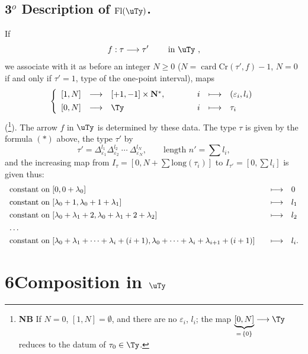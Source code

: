 \subsection*{3$^o$ Description of $\mathrm{Fl}(\uTy)$.}

If
\[
f : \tau \longrightarrow \tau' \qquad \ \text{in } \uTy\ ,
\]
we associate with it as before an integer \underline{$N \geq 0$} ($N = \operatorname{card}\mathrm{Cr}(\tau', f){-}1$, $N = 0$ if and only if $\tau' = 1$, type of the one-point interval), maps
\[
\left\{
\begin{array}{lcl@{\qquad\qquad}ccl}
{[1,N]} & \longrightarrow & [+1,-1] \times \mathbf{N}^*, & i & \longmapsto & (\varepsilon_i, l_i) \\[1ex]
{[0,N]} & \longrightarrow & \Ty & i & \longmapsto & \tau_i
\end{array}
\right.
\]
(\footnote[14]{\textbf{NB} If $N = 0$, $[1,N] = \emptyset$, and there are no $\varepsilon_i$, $l_i$; the map $\underbrace{[0,N]}_{=\,\{0\}} \longrightarrow \Ty$ reduces to the datum of $\tau_0 \in \Ty$.}). The arrow $f$ in $\uTy$ is determined by these data. The type $\tau$ is given by the formula $(*)$ above, the type $\tau'$ by %
\[
\tau' = \Delta^{l_1}_{\varepsilon_1} \Delta^{l_2}_{\varepsilon_2}\ \cdots\ \Delta^{l_N}_{\varepsilon_N}, \qquad \text{length } n' = \textstyle\sum l_i, \tag*{$(*')$}
\]
and the increasing map from $I_\tau = [0, N + \sum \mathrm{long}(\tau_i)]$ to $I_{\tau'} = [0, \sum l_i]$ is given thus:
\[
\begin{array}{l@{\qquad}cl}
\text{constant on } [0, 0+\lambda_0] & \longmapsto & 0 \\[1ex]
\text{constant on } [\lambda_0+1, \lambda_0+1+\lambda_1] & \longmapsto & l_1 \\[1ex]
\text{constant on } [\lambda_0+\lambda_1+2, \lambda_0+\lambda_1+2+\lambda_2] & \longmapsto & l_2 \\[1ex]
\ldots & & \\[1ex]
\text{constant on } [\lambda_0+\lambda_1+\cdots+\lambda_i+(i+1), \lambda_0+\cdots+\lambda_i+\lambda_{i+1}+(i+1)] & \longmapsto & l_i.
\end{array}
\]


\section*{6\quad Composition in $\uTy$}


